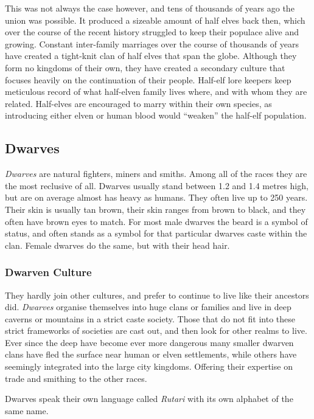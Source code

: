 This was not always the case however, and tens of thousands of years ago the
union was possible. It produced a sizeable amount of half elves back then,
which over the course of the recent history struggled to keep their populace
alive and growing. Constant inter-family marriages over the course of
thousands of years have created a tight-knit clan of half elves that span the
globe. Although they form no kingdoms of their own, they have created a
secondary culture that focuses heavily on the continuation of their
people. Half-elf lore keepers keep meticulous record of what half-elven family
lives where, and with whom they are related. Half-elves are encouraged to
marry within their own species, as introducing either elven or human blood
would ``weaken'' the half-elf population.

\subsection{Dwarves}
\label{sec:Dwarves}

\emph{Dwarves} are natural fighters, miners and smiths. Among all of the races
they are the most reclusive of all. Dwarves usually stand between 1.2 and 1.4
metres high, but are on average almost has heavy as humans. They often live
up to 250 years. Their skin is usually tan brown, their skin ranges from brown
to black, and they often have brown eyes to match. For most male dwarves the
beard is a symbol of status, and often stands as a symbol for that particular
dwarves caste within the clan. Female dwarves do the same, but with their
head hair.

\subsubsection*{Dwarven Culture}

They hardly join other cultures, and prefer to continue to live like their
ancestors did. \emph{Dwarves} organise themselves into huge clans or families
and live in deep caverns or mountains in a strict caste society. Those that do
not fit into these strict frameworks of societies are cast out, and then look
for other realms to live. Ever since the deep have become ever more dangerous
many smaller dwarven clans have fled the surface near human or elven
settlements, while others have seemingly integrated into the large city
kingdoms. Offering their expertise on trade and smithing to the other races.

Dwarves speak their own language called \emph{Rutari} with its own alphabet of
the same name.

